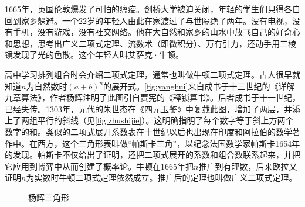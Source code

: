 \documentclass[b5paper]{ctexart}
\begin{document}
1665年，英国伦敦爆发了可怕的瘟疫。剑桥大学被迫关闭，年轻的学生们只得各自回到家乡躲避。一个22岁的年轻人由此在家渡过了与世隔绝了两年。没有电视，没有手机，没有游戏，没有社交网络。他在大自然和家乡的山水中放飞自己的好奇心和思想，思考出广义二项式定理、流数术（即微积分）、万有引力，还动手用三棱镜发现了光的色散。这个年轻人叫艾萨克·牛顿。

   
高中学习排列组合时会介绍二项式定理，通常也叫做牛顿二项式定理。古人很早就知道$n$为自然数时$(a + b)^n$的展开式。\cref{fig:yanghui}来自成书于十三世纪的《详解九章算法》，作者杨辉注明了此图引自贾宪的《释锁算书》。后者成书于十一世纪，已经失传。1303年，元代的朱世杰在《四元玉鉴》中复载此图，增加了两层，并添上了两组平行的斜线（见\cref{fig:zhushijie}）。这明确指明了每个数字等于斜上方两个数字的和。类似的二项式展开系数表在十世纪以后也出现在印度和阿拉伯的数学著作中。在西方，这个三角形表叫做“帕斯卡三角”，以纪念法国数学家帕斯卡1654年的发现。帕斯卡不仅给出了证明，还把二项式展开的系数和组合数联系起来，并把它应用到博弈中从而创建了概率论。牛顿在1665年把$n$推广到有理数，后来欧拉又证明$n$为实数时牛顿二项式定理依然成立。推广后的定理也叫做广义二项式定理。

\begin{figure}[htbp]
 \centering
  \qquad
 \caption{杨辉三角形}
\end{figure}
\end{document}
